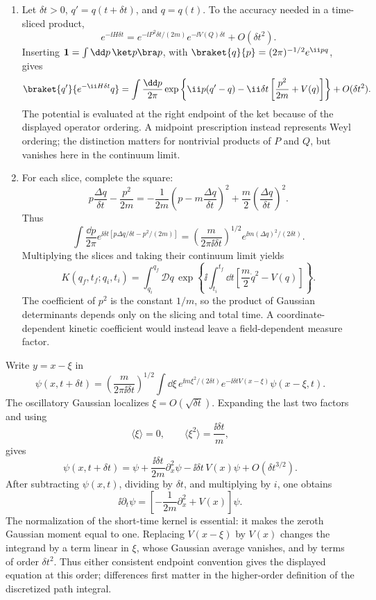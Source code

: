 
\begin{enumerate}
\begin{enumerate}
\item
Let \(\delta t>0\), \(q'=q(t+\delta t)\), and \(q=q(t)\).  To the
accuracy needed in a time-sliced product,
\[
 e^{-\ii H\delta t}
 =e^{-\ii P^2\delta t/(2m)}e^{-\ii V(Q)\delta t}
 +O(\delta t^2).
\]
Inserting \(\mathbf{1}=\int \dd p\,\ket p\bra p\), with
\(\braket{q}{p}=(2\pi)^{-1/2}e^{\ii pq}\), gives
\[
 \braket{q'}{e^{-\ii H\delta t}q}
 =\int\frac{\dd p}{2\pi}
 \exp\left\{\ii p(q'-q)-\ii\delta t
 \left[\frac{p^2}{2m}+V(q)\right]\right\}+O(\delta t^2).
\]
The potential is evaluated at the right endpoint of the ket because of the
displayed operator ordering.  A midpoint prescription instead represents
Weyl ordering; the distinction matters for nontrivial products of \(P\)
and \(Q\), but vanishes here in the continuum limit.
\item
For each slice, complete the square:
\[
 p\frac{\Delta q}{\delta t}-\frac{p^2}{2m}
 =-\frac1{2m}\left(p-m\frac{\Delta q}{\delta t}\right)^2
 +\frac m2\left(\frac{\Delta q}{\delta t}\right)^2.
\]
Thus
\[
 \int\frac{\dd p}{2\pi}e^{\ii\delta t[p\Delta q/\delta t-p^2/(2m)]}
 =\left(\frac{m}{2\pi \ii\delta t}\right)^{1/2}
 e^{\ii m(\Delta q)^2/(2\delta t)}.
\]
Multiplying the slices and taking their continuum limit yields
\[
 K(q_f,t_f;q_i,t_i)
 =\int_{q_i}^{q_f}\mathcal Dq\,
 \exp\left\{\ii\int_{t_i}^{t_f}\dd t
 \left[\frac m2\dot q^2-V(q)\right]\right\}.
\]
The coefficient of \(p^2\) is the constant \(1/m\), so the product of
Gaussian determinants depends only on the slicing and total time.  A
coordinate-dependent kinetic coefficient would instead leave a
field-dependent measure factor.
\end{enumerate}

Write \(y=x-\xi\) in
\[
 \psi(x,t+\delta t)=
 \left(\frac{m}{2\pi \ii\delta t}\right)^{1/2}
 \int \dd\xi\,
 e^{\ii m\xi^2/(2\delta t)}
 e^{-\ii\delta t V(x-\xi)}\psi(x-\xi,t).
\]
The oscillatory Gaussian localizes \(\xi=O(\sqrt{\delta t})\).  Expanding
the last two factors and using
\[
 \langle\xi\rangle=0,\qquad
 \langle\xi^2\rangle=\frac{\ii\delta t}{m},
\]
gives
\[
 \psi(x,t+\delta t)=\psi
 +\frac{\ii\delta t}{2m}\partial_x^2\psi
 -\ii\delta t\,V(x)\psi+O(\delta t^{3/2}).
\]
After subtracting \(\psi(x,t)\), dividing by \(\delta t\), and multiplying
by \(i\), one obtains
\[
 \ii\partial_t\psi=
 \left[-\frac1{2m}\partial_x^2+V(x)\right]\psi.
\]
The normalization of the short-time kernel is essential: it makes the
zeroth Gaussian moment equal to one.
Replacing \(V(x-\xi)\) by \(V(x)\) changes the integrand by a term linear in
\(\xi\), whose Gaussian average vanishes, and by terms of order
\(\delta t^2\).  Thus either consistent endpoint convention gives the
displayed equation at this order; differences first matter in the
higher-order definition of the discretized path integral.


\end{enumerate}
